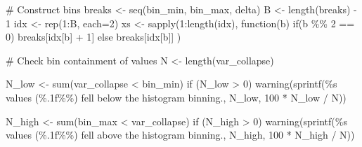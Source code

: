 \documentclass[
  letterpaper,
  DIV=11,
  numbers=noendperiod]{scrartcl}
\newenvironment{Shaded}{\begin{snugshade}}{\end{snugshade}}
\newcommand{\AttributeTok}[1]{\textcolor[rgb]{0.40,0.45,0.13}{#1}}
\newcommand{\CommentTok}[1]{\textcolor[rgb]{0.37,0.37,0.37}{#1}}
\newcommand{\ControlFlowTok}[1]{\textcolor[rgb]{0.00,0.23,0.31}{#1}}
\newcommand{\DecValTok}[1]{\textcolor[rgb]{0.68,0.00,0.00}{#1}}
\newcommand{\FunctionTok}[1]{\textcolor[rgb]{0.28,0.35,0.67}{#1}}
\newcommand{\NormalTok}[1]{\textcolor[rgb]{0.00,0.23,0.31}{#1}}
\newcommand{\OtherTok}[1]{\textcolor[rgb]{0.00,0.23,0.31}{#1}}
\newcommand{\SpecialCharTok}[1]{\textcolor[rgb]{0.37,0.37,0.37}{#1}}
\newcommand{\StringTok}[1]{\textcolor[rgb]{0.13,0.47,0.30}{#1}}
\begin{document}
\begin{Shaded}
\begin{Highlighting}[]
  \CommentTok{\# Construct bins}
\NormalTok{  breaks }\OtherTok{\textless{}{-}} \FunctionTok{seq}\NormalTok{(bin\_min, bin\_max, delta)}
\NormalTok{  B }\OtherTok{\textless{}{-}} \FunctionTok{length}\NormalTok{(breaks) }\SpecialCharTok{{-}} \DecValTok{1}
\NormalTok{  idx }\OtherTok{\textless{}{-}} \FunctionTok{rep}\NormalTok{(}\DecValTok{1}\SpecialCharTok{:}\NormalTok{B, }\AttributeTok{each=}\DecValTok{2}\NormalTok{)}
\NormalTok{  xs }\OtherTok{\textless{}{-}} \FunctionTok{sapply}\NormalTok{(}\DecValTok{1}\SpecialCharTok{:}\FunctionTok{length}\NormalTok{(idx),}
               \ControlFlowTok{function}\NormalTok{(b) }\ControlFlowTok{if}\NormalTok{(b }\SpecialCharTok{\%\%} \DecValTok{2} \SpecialCharTok{==} \DecValTok{0}\NormalTok{) breaks[idx[b] }\SpecialCharTok{+} \DecValTok{1}\NormalTok{]}
               \ControlFlowTok{else}\NormalTok{            breaks[idx[b]] )}

  \CommentTok{\# Check bin containment of values}
\NormalTok{  N }\OtherTok{\textless{}{-}} \FunctionTok{length}\NormalTok{(var\_collapse)}

\NormalTok{  N\_low }\OtherTok{\textless{}{-}} \FunctionTok{sum}\NormalTok{(var\_collapse }\SpecialCharTok{\textless{}}\NormalTok{ bin\_min)}
  \ControlFlowTok{if}\NormalTok{ (N\_low }\SpecialCharTok{\textgreater{}} \DecValTok{0}\NormalTok{)}
    \FunctionTok{warning}\NormalTok{(}\FunctionTok{sprintf}\NormalTok{(}\StringTok{\textquotesingle{}\%s values (\%.1f\%\%) fell below the histogram binning.\textquotesingle{}}\NormalTok{,}
\NormalTok{                    N\_low, }\DecValTok{100} \SpecialCharTok{*}\NormalTok{ N\_low }\SpecialCharTok{/}\NormalTok{ N))}

\NormalTok{  N\_high }\OtherTok{\textless{}{-}} \FunctionTok{sum}\NormalTok{(bin\_max }\SpecialCharTok{\textless{}}\NormalTok{ var\_collapse)}
  \ControlFlowTok{if}\NormalTok{ (N\_high }\SpecialCharTok{\textgreater{}} \DecValTok{0}\NormalTok{)}
    \FunctionTok{warning}\NormalTok{(}\FunctionTok{sprintf}\NormalTok{(}\StringTok{\textquotesingle{}\%s values (\%.1f\%\%) fell above the histogram binning.\textquotesingle{}}\NormalTok{,}
\NormalTok{                    N\_high, }\DecValTok{100} \SpecialCharTok{*}\NormalTok{ N\_high }\SpecialCharTok{/}\NormalTok{ N))}


\end{Highlighting}
\end{Shaded}
\end{document}
